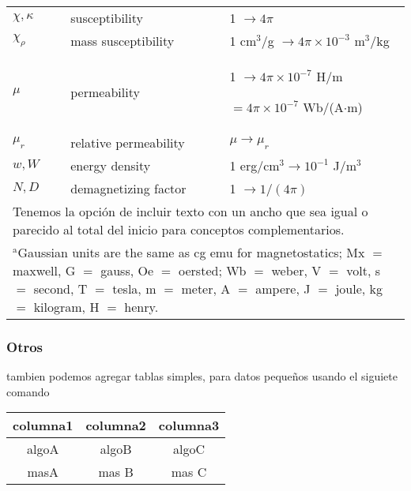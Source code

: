 \documentclass[a4paper]{IEEEtran} %
\begin{document}
\begin{table}
\begin{tabular}{|p{25pt}|p{75pt}|p{115pt}|}
$\chi, \kappa $& susceptibility                        & 1 $\to  4\pi $ \\
$\chi_{\rho }$ & mass susceptibility                    & 1 cm$^{3}$/g $\to  4\pi \times  10^{-3}$ m$^{3}$/kg \\
$\mu $         & permeability                           & 1 $\to  4\pi \times  10^{-7}$ H/m \par $= 4\pi \times  10^{-7}$ Wb/(A$\cdot $m) \\
$\mu_{r}$      & relative permeability                  & $\mu \to \mu_{r}$ \\
$w, W$         & energy density                         & 1 erg/cm$^{3} \to  10^{-1}$ J/m$^{3}$ \\
$N, D$         & demagnetizing factor                   & 1 $\to  1/(4\pi )$ \\
\hline
\multicolumn{3}{p{251pt}}{Tenemos la opción de incluir texto con un ancho que sea igual o parecido al total del inicio para conceptos complementarios.}\\ %
\multicolumn{3}{p{251pt}}{$^{\mathrm{a}}$Gaussian units are the same as cg emu for magnetostatics; Mx 
$=$ maxwell, G $=$ gauss, Oe $=$ oersted; Wb $=$ weber, V $=$ volt, s $=$ 
second, T $=$ tesla, m $=$ meter, A $=$ ampere, J $=$ joule, kg $=$ 
kilogram, H $=$ henry.} %
\end{tabular}
\end{table}

\subsubsection{Otros}

tambien podemos agregar tablas simples, para datos pequeños usando el siguiete comando

\begin{tabular}{ccc}  %
\hline
columna1 & columna2 & columna3 \\
\hline
algoA    & algoB    & algoC \\
masA     & mas B    & mas C 
\end{tabular}
\end{document}
